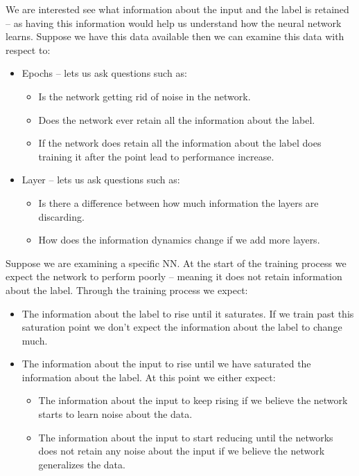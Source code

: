 \documentclass[dissertation.tex]{subfiles}
\begin{document}
We are interested see what information about the input and the label is retained
-- as having this information would help us understand how the neural network
learns.  Suppose we have this data available then we can examine this data with
respect to:
\begin{itemize}
  \item{
      Epochs -- lets us ask questions such as:
      \begin{itemize}
        \item{
            Is the network getting rid of noise in the network.
          }
        \item{
            Does the network ever retain all the information about the label.
          }
        \item{
            If the network does retain all the information about the label does
            training it after the point lead to performance increase.
          }
      \end{itemize}
    }
  \item{
      Layer -- lets us ask questions such as:
      \begin{itemize}
        \item{
            Is there a difference between how much information the layers are
            discarding.
          }
        \item{
            How does the information dynamics change if we add more layers.
          }
      \end{itemize}
    }
\end{itemize}

Suppose we are examining a specific NN. At the start of the training process we
expect the network to perform poorly -- meaning it does not retain information
about the label. Through the training process we expect: 
\begin{itemize}
  \item{
      The information about the label to rise until it saturates. If we train
      past this saturation point we don't expect the information about the label
      to change much.
    }
  \item{
      The information about the input to rise until we have saturated the
      information about the label. At this point we either expect:
      \begin{itemize}
        \item{
            The information about the input to keep rising if we believe the
            network starts to learn noise about the data.
          }
        \item{
            The information about the input to start reducing until the networks
            does not retain any noise about the input if we believe the network
            generalizes the data.
          }
      \end{itemize}
    }
\end{itemize}
\end{document}
